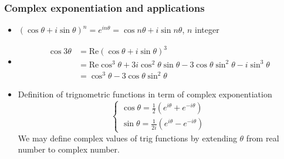 \subsubsection{ Complex exponentiation and applications } 
\begin{itemize}
	\item 
		\begin{theorem}[De Moivre]
			$\left( \cos \theta + i \sin \theta \right) ^{n} = e^{i n \theta} = \cos n \theta + i \sin n \theta$, $n$ integer
		\end{theorem}
	\item 	\begin{example}
			\begin{align*}
			\cos 3 \theta &= \text{Re}\left( \cos \theta + i \sin \theta \right) ^{3}\\
				      &= \text{Re}\cos^3 \theta + 3 i \cos^2 \theta \sin \theta - 3 \cos \theta \sin ^2 \theta - i \sin ^3 \theta\\
				      &= \cos^3 \theta - 3 \cos \theta \sin^2 \theta
		\end{align*}
		\end{example}
		
	\item  Definition of trignometric functions in term of complex exponentiation
		\begin{equation*}
			\begin{cases}
				\cos \theta = \frac{1}{2}(e^{i \theta} + e ^{- i \theta}) \\
				\sin \theta = \frac{1}{2i}(e^{i \theta} - e ^{- i \theta}) 
			\end{cases}
		\end{equation*}
We may define complex values of trig functions by extending $\theta$ from real number to complex number.
\end{itemize}



